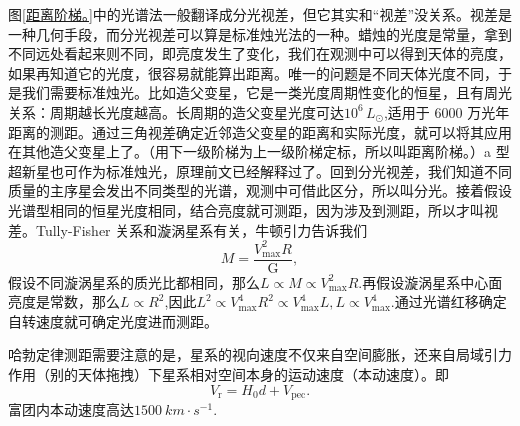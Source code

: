 \documentclass[../天体物理基础.tex]{subfiles}
\begin{document}
图\ref{距离阶梯。}中的光谱法一般翻译成分光视差，但它其实和“视差”没关系。视差是一种几何手段，而分光视差可以算是标准烛光法的一种。蜡烛的光度是常量，拿到不同远处看起来则不同，即亮度发生了变化，我们在观测中可以得到天体的亮度，如果再知道它的光度，很容易就能算出距离。唯一的问题是不同天体光度不同，于是我们需要标准烛光。比如造父变星，它是一类光度周期性变化的恒星，且有周光关系：周期越长光度越高。长周期的造父变星光度可达$10^{6}\,\unit{L_{\odot}}$,适用于 6000 万光年距离的测距。通过三角视差确定近邻造父变星的距离和实际光度，就可以将其应用在其他造父变星上了。（用下一级阶梯为上一级阶梯定标，所以叫距离阶梯。）\uppercase\expandafter{}a 型超新星也可作为标准烛光，原理前文已经解释过了。回到分光视差，我们知道不同质量的主序星会发出不同类型的光谱，观测中可借此区分，所以叫分光。接着假设光谱型相同的恒星光度相同，结合亮度就可测距，因为涉及到测距，所以才叫视差。Tully-Fisher 关系和漩涡星系有关，牛顿引力告诉我们
\begin{equation}
M=\frac{V_{\max}^{2}R}{\mathrm{G}},
\end{equation}
假设不同漩涡星系的质光比都相同，那么$L\propto{}M\propto{}V_{\text{max}}^{2}R$.再假设漩涡星系中心面亮度是常数，那么$L\propto{}R^{2}$,因此$L^{2}\propto{}V_{\max}^{4}R^{2}\propto{}V_{\max}^{4}L,L\propto{}V_{\max}^{4}$.通过光谱红移确定自转速度就可确定光度进而测距。

哈勃定律测距需要注意的是，星系的视向速度不仅来自空间膨胀，还来自局域引力作用（别的天体拖拽）下星系相对空间本身的运动速度（本动速度）。即
\begin{equation}
V_{\mathrm{r}}=H_{0}d+V_{\text{pec}}.
\end{equation}
富团内本动速度高达$\qty{1500}{km\cdot{}s^{-1}}$.

\printbibliography
\end{document}
